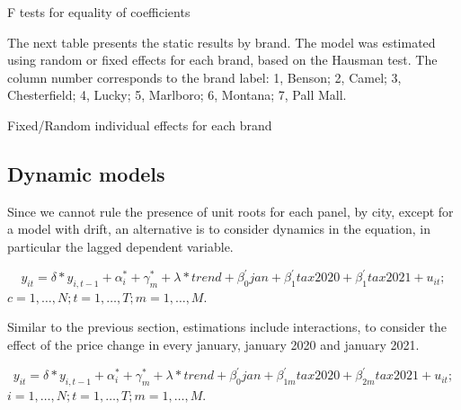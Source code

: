 \documentclass[]{article}
\begin{document}
\begin{landscape}
	\begin{table}[ht]
		\centering
		\caption{F tests for equality of coefficients \label{tab:Fxtreg}} 
	
	\end{table}
\end{landscape}
%	

The next table presents the static results by brand. The model was estimated using random or fixed effects for each brand, based on the Hausman test. The column number corresponds to the brand label: 1, Benson; 2, Camel; 3, Chesterfield; 4, Lucky; 5, Marlboro; 6, Montana; 7, Pall Mall.

\begin{landscape}
	\begin{table}[ht]
		\centering
		\caption{Fixed/Random individual effects for each brand \label{tab:staticXtregMarcas}} 
	
	\end{table}
\end{landscape}
 
\subsection{Dynamic models}
Since we cannot rule the presence of unit roots for each panel, by city, except for a model with drift, an alternative is to consider dynamics in the equation, in particular the lagged dependent variable. 

\begin{equation*} 
	y_{it}  = \delta*y_{i,t-1} + \alpha_{i}^{*} + \gamma_{m}^{*} + \lambda*trend + \beta_{0}^{'}jan + \beta_{1}^{'}tax2020 + \beta_{1}^{'}tax2021 + u_{it}
	;   \tag{4.3}
\end{equation*}
$c  = 1,\ldots,N;  t=1,\ldots,T; m=1,\ldots,M. $

Similar to the previous section, estimations include interactions, to consider the effect of the price change in every january, january 2020 and january 2021.

\begin{equation*} 
	y_{it}  = \delta*y_{i,t-1} +\alpha_{i}^{*} + \gamma_{m}^{*} + \lambda*trend + \beta_{0}^{'}jan + \beta_{1m}^{'}tax2020 + \beta_{2m}^{'}tax2021 + u_{it}
	;   \tag{4.4}
\end{equation*}
$i  = 1,\ldots,N;  t=1,\ldots,T; m=1,\ldots,M. $
\end{document}
